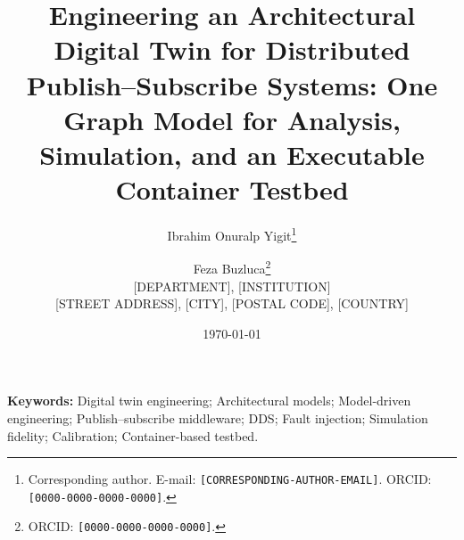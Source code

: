 \documentclass[11pt,a4paper]{article}
\title{\Large\bfseries Engineering an Architectural Digital Twin for Distributed Publish--Subscribe Systems: One Graph Model for Analysis, Simulation, and an Executable Container Testbed}
\author{
  Ibrahim Onuralp Yigit\thanks{Corresponding author. E-mail: \texttt{[CORRESPONDING-AUTHOR-EMAIL]}. ORCID: \texttt{[0000-0000-0000-0000]}.}
  \and
  Feza Buzluca\thanks{ORCID: \texttt{[0000-0000-0000-0000]}.}
  \\[6pt]
  \normalsize [DEPARTMENT], [INSTITUTION] \\
  \normalsize [STREET ADDRESS], [CITY], [POSTAL CODE], [COUNTRY]
}
\date{\today}
\theoremstyle{definition}
\begin{document}
\maketitle

\begin{abstract}

\end{abstract}

\noindent\textbf{Keywords:} Digital twin engineering; Architectural models; Model-driven engineering; Publish--subscribe middleware; DDS; Fault injection; Simulation fidelity; Calibration; Container-based testbed.

\linenumbers
















\end{document}
